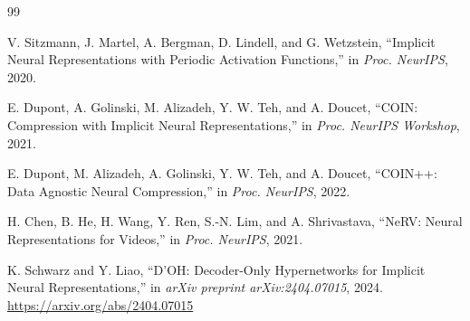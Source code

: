 \documentclass[11pt,a4paper]{article}
\begin{document}
\begin{thebibliography}{99}

V. Sitzmann, J. Martel, A. Bergman, D. Lindell, and G. Wetzstein,
``Implicit Neural Representations with Periodic Activation Functions,''
in \emph{Proc. NeurIPS}, 2020.

E. Dupont, A. Golinski, M. Alizadeh, Y. W. Teh, and A. Doucet,
``COIN: Compression with Implicit Neural Representations,''
in \emph{Proc. NeurIPS Workshop}, 2021.

E. Dupont, M. Alizadeh, A. Golinski, Y. W. Teh, and A. Doucet,
``COIN++: Data Agnostic Neural Compression,''
in \emph{Proc. NeurIPS}, 2022.

H. Chen, B. He, H. Wang, Y. Ren, S.-N. Lim, and A. Shrivastava,
``NeRV: Neural Representations for Videos,''
in \emph{Proc. NeurIPS}, 2021.

K. Schwarz and Y. Liao,
``D'OH: Decoder-Only Hypernetworks for Implicit Neural Representations,''
in \emph{arXiv preprint arXiv:2404.07015}, 2024.
\url{https://arxiv.org/abs/2404.07015}

\end{thebibliography}
\end{document}
